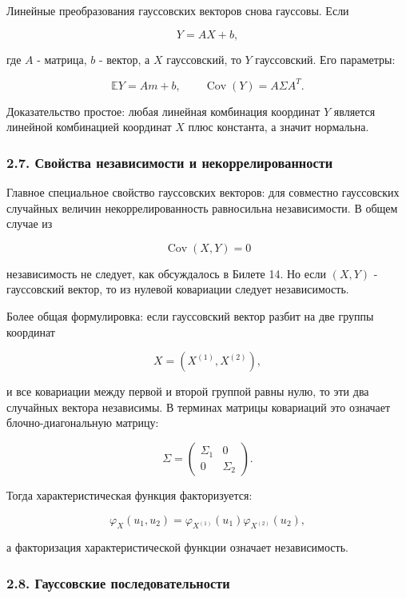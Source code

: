 \documentclass[
  11pt,
  a4paper,
]{article}
\begin{document}
Линейные преобразования гауссовских векторов снова гауссовы. Если

\[
Y=AX+b,
\]

где \(A\) - матрица, \(b\) - вектор, а \(X\) гауссовский, то \(Y\)
гауссовский. Его параметры:

\[
\mathbb EY=Am+b,
\qquad
\operatorname{Cov}(Y)=A\Sigma A^T.
\]

Доказательство простое: любая линейная комбинация координат \(Y\)
является линейной комбинацией координат \(X\) плюс константа, а значит
нормальна.

\subsubsection{2.7. Свойства независимости и
некоррелированности}\label{ux441ux432ux43eux439ux441ux442ux432ux430-ux43dux435ux437ux430ux432ux438ux441ux438ux43cux43eux441ux442ux438-ux438-ux43dux435ux43aux43eux440ux440ux435ux43bux438ux440ux43eux432ux430ux43dux43dux43eux441ux442ux438}

Главное специальное свойство гауссовских векторов: для совместно
гауссовских случайных величин некоррелированность равносильна
независимости. В общем случае из

\[
\operatorname{Cov}(X,Y)=0
\]

независимость не следует, как обсуждалось в Билете 14. Но если \((X,Y)\)
- гауссовский вектор, то из нулевой ковариации следует независимость.

Более общая формулировка: если гауссовский вектор разбит на две группы
координат

\[
X=(X^{(1)},X^{(2)}),
\]

и все ковариации между первой и второй группой равны нулю, то эти два
случайных вектора независимы. В терминах матрицы ковариаций это означает
блочно-диагональную матрицу:

\[
\Sigma=
\begin{pmatrix}
\Sigma_1 & 0\\
0 & \Sigma_2
\end{pmatrix}.
\]

Тогда характеристическая функция факторизуется:

\[
\varphi_X(u_1,u_2)
=
\varphi_{X^{(1)}}(u_1)\varphi_{X^{(2)}}(u_2),
\]

а факторизация характеристической функции означает независимость.

\subsubsection{2.8. Гауссовские
последовательности}\label{ux433ux430ux443ux441ux441ux43eux432ux441ux43aux438ux435-ux43fux43eux441ux43bux435ux434ux43eux432ux430ux442ux435ux43bux44cux43dux43eux441ux442ux438}
\end{document}
